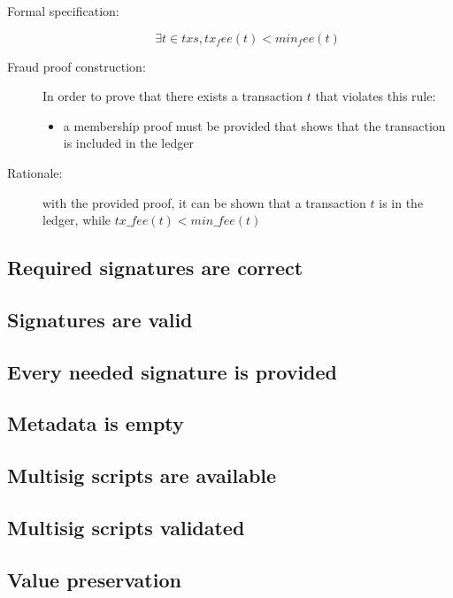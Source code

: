 \documentclass[../main.tex]{subfiles}
\begin{document}
\begin{description}

\item[Formal specification:]
\begin{equation*}
    \exists t \in txs, tx_fee(t) < min_fee(t)
\end{equation*}

\item[Fraud proof construction:] In order to prove that there exists a transaction $t$ that violates this rule:
\begin{itemize}
    \item a membership proof must be provided that shows that the transaction is included in the ledger
\end{itemize}

\item[Rationale:] with the provided proof, it can be shown that a transaction $t$ is in the ledger, while $tx\_fee(t) < min\_fee(t)$

\end{description}

\subsection{Required signatures are correct}

\subsection{Signatures are valid}

\subsection{Every needed signature is provided}

\subsection{Metadata is empty}

\subsection{Multisig scripts are available}

\subsection{Multisig scripts validated}

\subsection{Value preservation}
\end{document}
